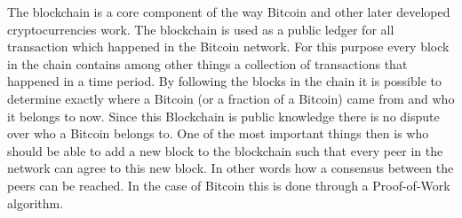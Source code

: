 The blockchain is a core component of the way Bitcoin and other later developed cryptocurrencies work. The blockchain is used as a public ledger for all transaction which happened in the Bitcoin
network. For this purpose every block in the chain contains among other things a collection of transactions that happened in a time period. By following the blocks in the chain it is possible to
determine exactly where a Bitcoin (or a fraction of a Bitcoin) came from and who it belongs to now. Since this Blockchain is public knowledge there is no dispute over who a Bitcoin belongs to.
One of the most important things then is who should be able to add a new block to the blockchain such that every peer in the network can agree to this new block. In other words how a consensus between
the peers can be reached. In the case of Bitcoin this is done through a Proof-of-Work algorithm.
